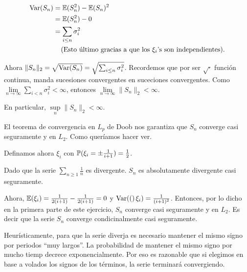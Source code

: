\begin{align}
        \text{Var}\! \left( S_n \right)       &=  \mathbb{E}(S_n^2) - \mathbb{E}(S_n)^2                                               \\
                        &=  \mathbb{E}(S_n^2) - 0                                                       \\
                        &=  \sum_{i \leq n} \sigma_i^2                                          \\
                        &\;\;\;\;\mbox{(Esto último gracias a que los $\xi_i$'s son independientes)}.
\end{align}

Ahora $\| S_n \|_2 = \sqrt{\text{Var}\! \left( S_n \right)} = \sqrt{\sum_{i \leq n} \sigma_i^2}$. Recordemos que por ser  $\sqrt{\cdot}$
función continua, manda sucesiones convergentes en suceciones convergentes. Como 
$\lim\limits_{n \rightarrow \infty} \sum\limits_{i < n} \sigma_i^2 < \infty$, 
entonces $\lim\limits_{n \rightarrow \infty}\| S_n \|_2 < \infty$.\par\null

En particular, $\sup\limits_n \| S_n \|_2 < \infty$.\par\null

El teorema de convergencia en $L_p$ de Doob nos garantiza que $S_n$ converge casi seguramente y en $L_2$. Como queríamos
hacer ver.\par\null

Definamos ahora $\xi_i$ con $\mathbb{P}(\xi_i = \pm \frac{1}{i+1}) = \frac{1}{2}$.

Dado que la serie $\sum_{n \geq 1} \frac{1}{n}$ es divergente. $S_n$ es absolutamente divergente casi seguramente.\par\null

Ahora, $\mathbb{E}(\xi_i) = \frac{1}{2(i+1)}-\frac{1}{2(i+1)} = 0$ y $\text{Var}\! \left( ( \right)\xi_i) = \frac{1}{(i+1)^2}$. Entonces, por lo dicho en la primera
parte de este ejercicio, $S_n$ converge casi seguramente y en $L_2$. Es decir que la serie $S_n$ converge condicinalmente casi seguramente.

Heurísticamente, para que la serie diverja es necesario mantener el mismo signo por periodos ``muy largos''. La probabilidad de mantener el 
mismo signo por mucho tiemp decrece exponencialmente. Por eso es razonable que si elegimos en base a volados los signos de los términos,
la serie terminará convergiendo.